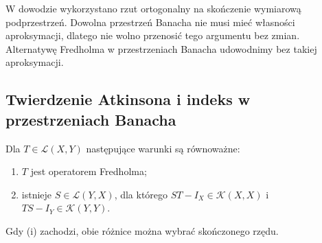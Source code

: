 \begin{uwaga}
\label{rem:fredholm-hilbert-scope30}
W dowodzie wykorzystano rzut ortogonalny na skończenie
wymiarową podprzestrzeń. Dowolna przestrzeń Banacha
nie musi mieć własności aproksymacji, dlatego nie wolno
przenosić tego argumentu bez zmian. Alternatywę Fredholma
w przestrzeniach Banacha udowodnimy bez takiej aproksymacji.
\end{uwaga}

\subsection{Twierdzenie Atkinsona i indeks w przestrzeniach Banacha}

\begin{twierdzenie}
\label{thm:atkinson30}
Dla $T\in\mathcal L(X,Y)$ następujące warunki są równoważne:
\begin{enumerate}[label=\textup{(\roman*)}]
\item $T$ jest operatorem Fredholma;
\item istnieje $S\in\mathcal L(Y,X)$, dla którego
$ST-I_X\in\mathcal K(X,X)$ i $TS-I_Y\in\mathcal K(Y,Y)$.
\end{enumerate}
Gdy (i) zachodzi, obie różnice można wybrać skończonego rzędu.
\end{twierdzenie}
